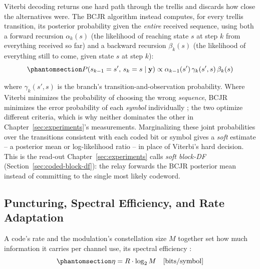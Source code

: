 Viterbi decoding returns one hard path through the trellis and discards how close the alternatives were. The BCJR algorithm \cite{BahlCockeJelinekRaviv1974BCJR} instead computes, for every trellis transition, its posterior probability given the \emph{entire} received sequence, using both a forward recursion $\alpha_k(s)$ (the likelihood of reaching state $s$ at step $k$ from everything received so far) and a backward recursion $\beta_k(s)$ (the likelihood of everything still to come, given state $s$ at step $k$):
\begin{equation}\protect\phantomsection\label{eq:bcjr-posterior}{P(s_{k-1}=s',\, s_k=s \mid \mathbf{y}) \propto \alpha_{k-1}(s')\,\gamma_k(s',s)\,\beta_k(s)}\end{equation}

where $\gamma_k(s',s)$ is the branch's transition-and-observation probability. Where Viterbi minimizes the probability of choosing the wrong \emph{sequence}, BCJR minimizes the error probability of each \emph{symbol} individually \cite{BahlCockeJelinekRaviv1974BCJR}; the two optimize different criteria, which is why neither dominates the other in Chapter~\ref{sec:experiments}'s measurements. Marginalizing these joint probabilities over the transitions consistent with each coded bit or symbol gives a \emph{soft} estimate -- a posterior mean or log-likelihood ratio -- in place of Viterbi's hard decision. This is the read-out Chapter~\ref{sec:experiments} calls \emph{soft block-DF} (Section~\ref{sec:coded-block-df}): the relay forwards the BCJR posterior mean instead of committing to the single most likely codeword.

\subsection{Puncturing, Spectral Efficiency, and Rate Adaptation}\label{sec:puncturing-spectral-efficiency}

A code's rate and the modulation's constellation size $M$ together set how much information it carries per channel use, its spectral efficiency \cite{ProakisSalehi2008DigitalComm}:
\begin{equation}\protect\phantomsection\label{eq:spectral-efficiency}{\eta = R \cdot \log_2 M \quad \text{[bits/symbol]}}\end{equation}

